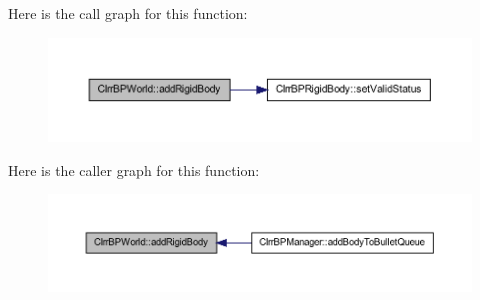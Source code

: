 Here is the call graph for this function:\nopagebreak
\begin{figure}[H]
\begin{center}
\leavevmode
\includegraphics[width=400pt]{class_c_irr_b_p_world_a0bf527c522426b50d959ab5adc27be4c_cgraph}
\end{center}
\end{figure}




Here is the caller graph for this function:\nopagebreak
\begin{figure}[H]
\begin{center}
\leavevmode
\includegraphics[width=400pt]{class_c_irr_b_p_world_a0bf527c522426b50d959ab5adc27be4c_icgraph}
\end{center}
\end{figure}


